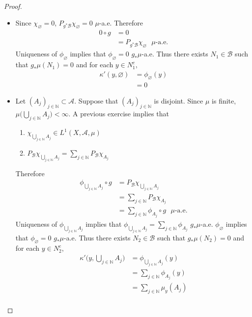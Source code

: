 \documentclass[12pt]{amsart}
\theoremstyle{definition}
\newcommand{\kap}{\kappa}
\newcommand{\N}{\mathbb{N}}
\newcommand{\MA}{\mathcal{A}}
\newcommand{\MB}{\mathcal{B}}
\begin{document}
	\begin{proof}\
		\begin{itemize}
			\item Since $\chi_{\varnothing} = 0$, $P_{g^*\MB}\chi_{\varnothing} = 0$ $\mu$-a.e. Therefore
			\begin{align*}
				0 \circ g 
				& =  0 \\
				& = P_{g^*\MB}\chi_{\varnothing} \text{ $\mu$-a.e.}
			\end{align*}
			Uniqueness of $\phi_{\varnothing}$ implies that $\phi_{\varnothing} = 0$ $g_*\mu$-a.e. Thus there exists $N_1 \in \MB$ such that $g_*\mu(N_1) = 0$ and for each $y \in N_1^c$, 
			\begin{align*}
				\kap'(y, \varnothing) 
				& = \phi_{\varnothing}(y) \\
				& = 0
			\end{align*}
			\item Let $(A_j)_{j \in \N} \subset \MA$. Suppose that $(A_j)_{j \in \N}$ is disjoint. Since $\mu$ is finite, $\mu \bigg( \bigcup\limits_{j \in \N}A_j \bigg) < \infty$. A previous exercise implies that  
			\begin{enumerate}
				\item $\chi_{\bigcup\limits_{j \in \N} A_j} \in L^1(X, \MA, \mu)$
				\item $P_{\MB} \chi_{\bigcup\limits_{j \in \N} A_j} = \sum\limits_{j \in \N} P_{\MB}\chi_{A_j}$
			\end{enumerate}
			Therefore
			\begin{align*}
				\phi_{\bigcup\limits_{j \in \N} A_j} \circ g
				& = P_{\MB} \chi_{\bigcup\limits_{j \in \N} A_j} \\
				& = \sum\limits_{j \in \N} P_{\MB}\chi_{A_j} \\
				& = \sum\limits_{j \in \N} \phi_{A_j} \circ g \text{ $\mu$-a.e.}
			\end{align*}
			Uniqueness of $\phi_{\bigcup\limits_{j \in \N} A_j}$ implies that $\phi_{\bigcup\limits_{j \in \N} A_j} = \sum\limits_{j \in \N} \phi_{A_j}$ $g_*\mu$-a.e. $\phi_{\varnothing}$ implies that $\phi_{\varnothing} = 0$ $g_*\mu$-a.e. Thus there exists $N_2 \in \MB$ such that $g_*\mu(N_2) = 0$ and for each $y \in N_2^c$,
			\begin{align*}
				\kap' \bigg(y, \bigcup\limits_{j \in \N} A_j \bigg)
				& = \phi_{\bigcup\limits_{j \in \N} A_j}(y) \\
				& = \sum\limits_{j \in \N} \phi_{A_j}(y) \\
				& = \sum\limits_{j \in \N} \mu_y(A_j) \\

\end{align*}
\end{itemize}
\end{proof}
\end{document}

